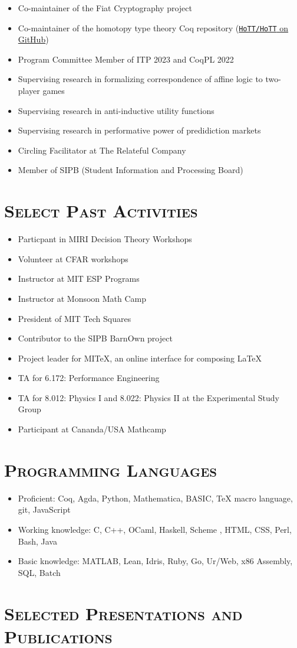 \documentclass[11pt]{res}
\begin{document}
\begin{itemize}
\item Co-maintainer of the Fiat Cryptography project
\item Co-maintainer of the homotopy type theory Coq repository (\href{https://github.com/HoTT/HoTT}{\texttt{HoTT/HoTT} on GitHub})
\item Program Committee Member of ITP 2023 and CoqPL 2022
\item Supervising research in formalizing correspondence of affine logic to two-player games
\item Supervising research in anti-inductive utility functions
\item Supervising research in performative power of predidiction markets
\item Circling Facilitator at The Relateful Company
\item Member of SIPB (Student Information and Processing Board)
\end{itemize}

\section{\textsc{Select Past Activities}}

\begin{itemize}
\item Particpant in MIRI Decision Theory Workshops
\item Volunteer at CFAR workshops
\item Instructor at MIT ESP Programs
\item Instructor at Monsoon Math Camp
\item President of MIT Tech Squares
\item Contributor to the SIPB BarnOwn project
\item Project leader for MITeX, an online interface for composing \LaTeX
\item TA for 6.172: Performance Engineering
\item TA for 8.012: Physics I and 8.022: Physics II at the Experimental Study Group
\item Participant at Cananda/USA Mathcamp
\end{itemize}

\section{\textsc{Programming Languages}}
\begin{itemize}
\item
  Proficient: Coq, Agda, Python, %
  Mathematica, BASIC, \TeX{} macro language, git, JavaScript
\item
  Working knowledge: %
  C, C++, OCaml, Haskell, Scheme%
  , HTML, CSS, Perl, Bash, Java
\item
  Basic knowledge: MATLAB, Lean, Idris, Ruby, Go, Ur/Web, x86 Assembly, SQL, Batch
\end{itemize}

\nocite{*}

\clearpage
\section{\textsc{Selected Presentations and Publications}}
\printbibliography[title={$\left.\right.$},notcategory=exclude]

\endresume
\end{document}
